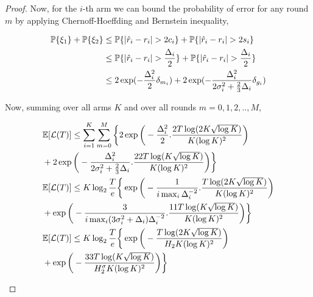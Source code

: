 \begin{proof}
Now, for the $i$-th arm we can bound the probability of error for any round $m$ by applying Chernoff-Hoeffding and Bernstein inequality,
\begin{small}
\begin{align*}
 \mathbb{P}\lbrace \xi_1\rbrace  + \mathbb{P}\lbrace \xi_2 \rbrace &\leq \mathbb{P}\lbrace |\hat{r}_i -r_i| > 2c_i \rbrace + \mathbb{P}\lbrace |\hat{r}_i -r_i| > 2s_i \rbrace\\ 
&\leq \mathbb{P}\lbrace |\hat{r}_i - r_i| > \frac{\Delta_i}{2} \rbrace + \mathbb{P}\lbrace |\hat{r}_i - r_i| > \frac{\Delta_i}{2} \rbrace \\
&\leq 2\exp( -\frac{\Delta_{i}^{2}}{2}\delta_{m_{i}} ) + 2\exp(- \frac{\Delta_{i}^{2}}{2\sigma_{i}^{2}+ \frac{2}{3}\Delta_i}\delta_{g_{i}})
\end{align*}
\end{small}
Now, summing over all arms $K$ and over all rounds $m=0,1,2,..,M$,
\begin{small}
\begin{align*}
&\mathbb{E}[\mathcal{L}(T)] \leq \sum_{i=1}^{K}\sum_{m=0}^{M}\bigg\lbrace 2\exp\bigg( -\frac{\Delta_{i}^{2}}{2}.\frac{2T\log (2 K\sqrt{\log K})}{K (\log K)^2}\bigg)\\
& + 2\exp\bigg(- \frac{\Delta_{i}^{2}}{2\sigma_{i}^{2}+ \frac{2}{3}\Delta_i}.\frac{22T\log ( K\sqrt{\log K})}{ K(\log K)^2} \bigg)\bigg\rbrace\\
&\mathbb{E}[\mathcal{L}(T)] \leq K\log_2\frac{T}{e}\bigg\lbrace\exp\bigg( -\frac{1}{i\max_{i}\Delta_{i}^{-2}}.\frac{T\log (2 K\sqrt{\log K})}{K (\log K)^2}\bigg)\\
& + \exp\bigg(- \frac{3}{i\max_i(3\sigma_{i}^{2}+ \Delta_i)\Delta_{i}^{-2}}.\frac{11T\log ( K\sqrt{\log K})}{ K(\log K)^2} \bigg)\bigg\rbrace\\
&\mathbb{E}[\mathcal{L}(T)] \leq K\log_2\frac{T}{e}\bigg\lbrace\exp\bigg( -\frac{T\log (2 K\sqrt{\log K})}{H_2 K (\log K)^2}\bigg)\\
& + \exp\bigg(- \frac{33T\log ( K\sqrt{\log K})}{H_{2}^{\sigma} K(\log K)^2} \bigg)\bigg\rbrace\\
\end{align*}
\end{small}



\end{proof}
